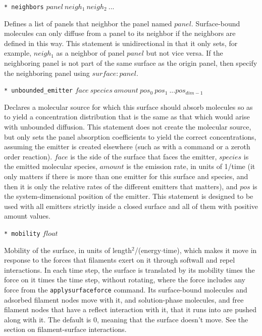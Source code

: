 \documentclass {scrbook}
\newcommand {\ttt} {\texttt}
\begin{document}
\begin{description}
\item{\ttt{* neighbors} $panel\ neigh_1\ neigh_2\ ...$}

Defines a list of panels that neighbor the panel named $panel$. Surface-bound molecules can only diffuse from a panel to its neighbor if the neighbors are defined in this way. This statement is unidirectional in that it only sets, for example, $neigh_1$ as a neighbor of panel $panel$ but not vice versa. If the neighboring panel is not part of the same surface as the origin panel, then specify the neighboring panel using $surface:panel$.

\item{\ttt{* unbounded\_emitter} $face\ species\ amount\ pos_0\ pos_1\ ... pos_{dim-1}$}

Declares a molecular source for which this surface should absorb molecules so as to yield a concentration distribution that is the same as that which would arise with unbounded diffusion. This statement does not create the molecular source, but only sets the panel absorption coefficients to yield the correct concentrations, assuming the emitter is created elsewhere (such as with a command or a zeroth order reaction). $face$ is the side of the surface that faces the emitter, $species$ is the emitted molecular species, $amount$ is the emission rate, in units of 1/time (it only matters if there is more than one emitter for this surface and species, and then it is only the relative rates of the different emitters that matters), and $pos$ is the system-dimensional position of the emitter. This statement is designed to be used with all emitters strictly inside a closed surface and all of them with positive amount values.

\item{\ttt{* mobility} $float$}

Mobility of the surface, in units of length$^2$/(energy$\cdot$time), which makes it move in response to the forces that filaments exert on it through softwall and repel interactions. In each time step, the surface is translated by its mobility times the force on it times the time step, without rotating, where the force includes any force from the \ttt{applysurfaceforce} command. Its surface-bound molecules and adsorbed filament nodes move with it, and solution-phase molecules, and free filament nodes that have a reflect interaction with it, that it runs into are pushed along with it. The default is 0, meaning that the surface doesn't move. See the section on filament-surface interactions.


\end{description}
\end{document}
